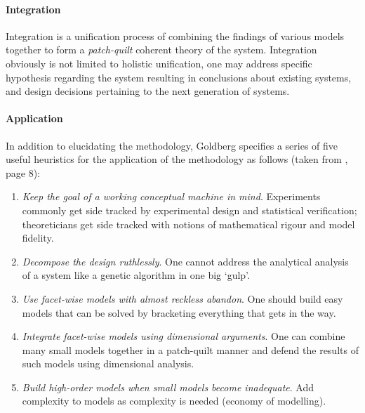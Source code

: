 %
%
\paragraph{Integration} Integration is a unification process of combining the findings of various models together to form a \emph{patch-quilt} coherent theory of the system. Integration obviously is not limited to holistic unification, one may address specific hypothesis regarding the system resulting in conclusions about existing systems, and design decisions pertaining to the next generation of systems.

%
%
\paragraph{Application} In addition to elucidating the methodology, Goldberg specifies a series of five useful heuristics for the application of the methodology as follows (taken from \cite{Goldberg1999a}, page 8):

\begin{enumerate}
	\item \emph{Keep the goal of a working conceptual machine in mind}. Experiments commonly get side tracked by experimental design and statistical verification; theoreticians get side tracked with notions of mathematical rigour and model fidelity.
	\item \emph{Decompose the design ruthlessly}. One cannot address the analytical analysis of a system like a genetic algorithm in one big `gulp'.
	\item \emph{Use facet-wise models with almost reckless abandon}. One should build easy models that can be solved by bracketing everything that gets in the way.
	\item \emph{Integrate facet-wise models using dimensional arguments}. One can combine many small models together in a patch-quilt manner and defend the results of such models using dimensional analysis.
	\item \emph{Build high-order models when small models become inadequate}. Add complexity to models as complexity is needed (economy of modelling).
\end{enumerate}

%
%
